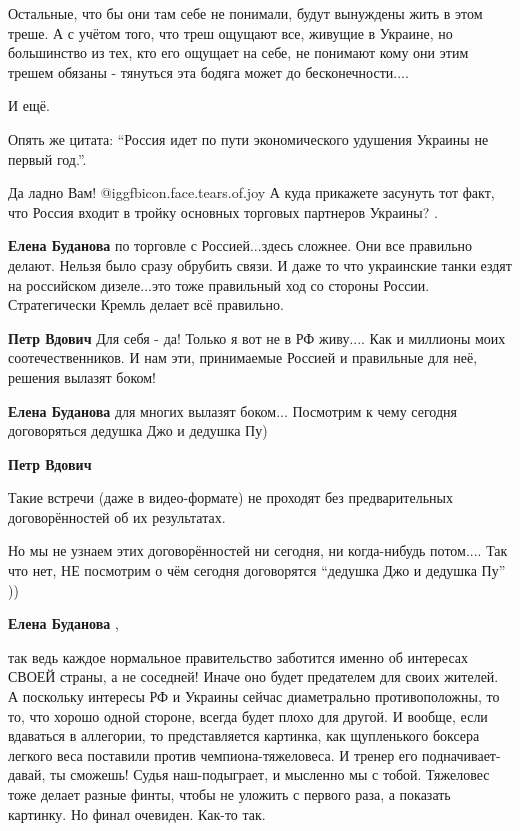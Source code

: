 \begin{itemize}
Остальные, что бы они там себе не понимали, будут вынуждены жить в этом треше.
А с учётом того, что треш ощущают все, живущие в Украине, но большинство из
тех, кто его ощущает на себе, не понимают кому они этим трешем обязаны -
тянуться эта бодяга может до бесконечности....

И ещё.

Опять же цитата: \enquote{Россия идет по пути экономического удушения Украины не первый
год.}.

Да ладно Вам!  @igg{fbicon.face.tears.of.joy}  А куда прикажете засунуть тот факт, что Россия входит в тройку
основных торговых партнеров Украины? .

\begin{itemize} %
\textbf{Елена Буданова} по торговле с Россией...здесь сложнее. Они все правильно делают. Нельзя было сразу обрубить связи.
И даже то что украинские танки ездят на российском дизеле...это тоже правильный ход со стороны России.
Стратегически Кремль делает всё правильно.

\textbf{Петр Вдович} Для себя - да! Только я вот не в РФ живу.... Как и миллионы моих соотечественников. И нам эти, принимаемые Россией и правильные для неё, решения вылазят боком!

\textbf{Елена Буданова} для многих вылазят боком...
Посмотрим к чему сегодня договоряться дедушка Джо и дедушка Пу)

\textbf{Петр Вдович} 

Такие встречи (даже в видео-формате) не проходят без предварительных
договорённостей об их результатах.

Но мы не узнаем этих договорённостей ни сегодня, ни когда-нибудь потом.... Так
что нет, НЕ посмотрим о чём сегодня договорятся \enquote{дедушка Джо и дедушка Пу} ))

\textbf{Елена Буданова} ,

так ведь каждое нормальное правительство заботится именно об интересах СВОЕЙ
страны, а не соседней! Иначе оно будет предателем для своих жителей. А поскольку
интересы РФ и Украины сейчас диаметрально противоположны, то то, что хорошо одной
стороне, всегда будет плохо для другой. И вообще, если вдаваться в аллегории, то
представляется картинка, как щупленького боксера легкого веса поставили против
чемпиона-тяжеловеса. И тренер его подначивает-давай, ты сможешь! Судья
наш-подыграет, и мысленно мы с тобой. Тяжеловес тоже делает разные финты, чтобы
не уложить с первого раза, а показать картинку. Но финал очевиден. Как-то так.


\end{itemize}
\end{itemize}
